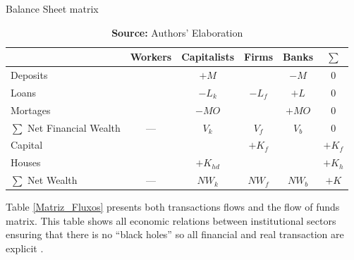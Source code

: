 \documentclass[11pt]{article}
\begin{document}
\begin{table}[H]
\centering
\caption{Balance Sheet matrix}
\label{Matriz_Estoques}
\begin{tabular}{lccccc}
\hline
\hline
                          & Workers & Capitalists      & Firms        & Banks  &    $\sum$ \\ \hline

Deposits & & $+M$ & & $-M$ & 0\\
Loans& &$-L_{k}$ &$-L_f$& $+L$ & 0\\
Mortages & &$-MO$&  & $+MO$ & 0\\\hline
$\sum$ Net Financial Wealth &--- &$V_{k}$&$V_f$&$V_b$& $0$\\\hline
Capital & & &$+K_f$&  & $+K_f$\\
Houses & &$+K_{hd}$& &   & $+K_h$\\\hline
$\sum$ Net Wealth &---&$NW_{k}$&$NW_f$&$NW_b$& $+K$\\
\hline
\hline
\end{tabular}%
\caption*{\textbf{Source:} Authors' Elaboration}
\end{table}

Table  \ref{Matriz_Fluxos} presents both transactions flows and the flow of funds matrix. 
This table shows all economic relations between institutional sectors ensuring that there is no  ``black holes''
so all financial and real transaction are explicit \cite{macedo_e_silva_peering_2011}.
\end{document}
